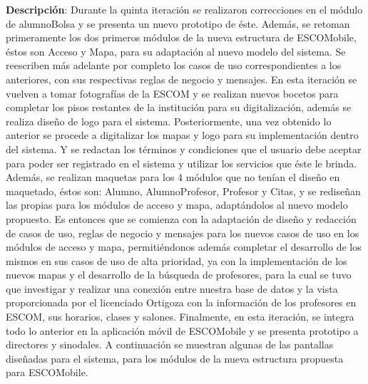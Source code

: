 \noindent
\textbf{Descripción}: Durante la quinta iteración se realizaron correcciones en el módulo de alumnoBolsa y se presenta un nuevo prototipo de éste. Además, se retoman primeramente los dos primeros módulos de la nueva estructura de ESCOMobile, éstos son Acceso y Mapa, para su adaptación al nuevo modelo del sistema. Se reescriben más adelante por completo los casos de uso correspondientes a los anteriores, con sus respectivas reglas de negocio y mensajes.
\newline
En esta iteración se vuelven a tomar fotografías de la ESCOM y se realizan nuevos bocetos para completar los pisos restantes de la institución para su digitalización, además se realiza diseño de logo para el sistema. Posteriormente, una vez obtenido lo anterior se procede a digitalizar los mapas y logo para su implementación dentro del sistema. Y se redactan los términos y condiciones que el usuario debe aceptar para poder ser registrado en el sistema y utilizar los servicios que éste le brinda. 
\newline
\newline
Además, se realizan maquetas para los 4 módulos que no tenían el diseño en maquetado, éstos son: Alumno, AlumnoProfesor, Profesor y Citas, y se rediseñan las propias para los módulos de acceso y mapa, adaptándolos al nuevo modelo propuesto. 
\newline
Es entonces que se comienza con la adaptación de diseño y redacción de casos de uso, reglas de negocio y mensajes para los nuevos casos de uso en los módulos de acceso y mapa, permitiéndonos además completar el desarrollo de los mismos en sus casos de uso de alta prioridad, ya con la implementación de los nuevos mapas y el desarrollo de la búsqueda de profesores, para la cual se tuvo que investigar y realizar una conexión entre nuestra base de datos y la vista proporcionada por el licenciado Ortigoza con la información de los profesores en ESCOM, sus horarios, clases y salones.
\newline
Finalmente, en esta iteración, se integra todo lo anterior en la aplicación móvil de ESCOMobile y se presenta prototipo a directores y sinodales.
\newline
A continuación se muestran algunas de las pantallas diseñadas para el sistema, para los módulos de la nueva estructura propuesta para ESCOMobile. 
